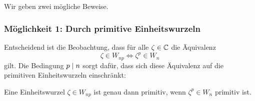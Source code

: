 \subsection{}

Wir geben zwei mögliche Beweise.



\subsubsection*{Möglichkeit 1: Durch primitive Einheitswurzeln}

Entscheidend ist die Beobachtung, dass für alle $\zeta \in \mathbb{C}$ die Äquivalenz
\[
        \zeta \in W_{np}
  \iff  \zeta^p \in W_n
\]
gilt.
Die Bedingung $p \mathrel{|} n$ sorgt dafür, dass sich diese Äquivalenz auf die primitiven Einheitswurzeln einschränkt:

\begin{claim}
  Eine Einheitswurzel $\zeta \in W_{np}$ ist genau dann primitiv, wenn $\zeta^p \in W_n$ primitiv ist.
\end{claim}

